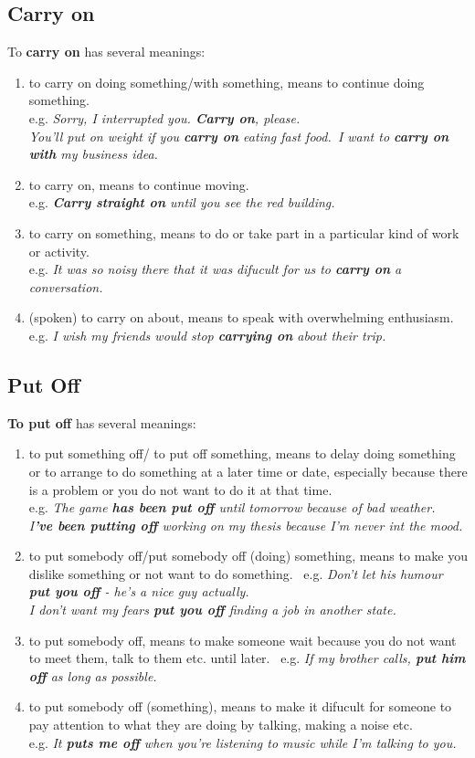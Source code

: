 \documentclass[hidelinks,10pt,a4paper]{article}
\begin{document}
\subsection{Carry on}
To \textbf{carry on} has several meanings:
\begin{enumerate}[label=(\alph*)]
	\item to carry on doing something/with something, means to continue doing something. \\
		e.g. \textit{Sorry, I interrupted you. \textbf{Carry on}, please.\\
		You'll put on weight if you \textbf{carry on} eating fast food.\
		I want to \textbf{carry on with} my business idea. }
	\item to carry on, means to continue moving. \\
		e.g. \textit{\textbf{Carry straight on} until you see the red building. }
	\item to carry on something, means to do or take part in a particular kind of work or activity. \\
		e.g. \textit{It was so noisy there that it was difucult for us to \textbf{carry on} a conversation. }
	\item (spoken) to carry on about, means to speak with overwhelming enthusiasm.\\
		e.g. \textit{I wish my friends would stop \textbf{carrying on} about their trip. }
\end{enumerate}

\subsection{Put Off}
\textbf{To put off} has several meanings:
\begin{enumerate}[label=(\alph*)]
	\item to put something off/ to put off something, means to delay doing something or to arrange to do something at a later time or date, especially because there is a problem or you do not want to do it at that time. \\
		e.g. \textit{The game \textbf{has been put off} until tomorrow because of bad weather. \\
		I\textbf{'ve been putting off} working on my thesis because I'm never int the mood. }
	\item to put somebody off/put somebody off (doing) something, means to make you dislike something or not want to do something. \
		e.g. \textit{Don't let his humour \textbf{put you off} - he's a nice guy actually.\\
		I don't want my fears \textbf{put you off} finding a job in another state. }
	\item to put somebody off, means to make someone wait because you do not want to meet them, talk to them etc. until later. \
		e.g. \textit{If my brother calls, \textbf{put him off} as long as possible. }
	\item to put somebody off (something), means to make it difucult for someone to pay attention to what they are doing by talking, making a noise etc. \\
		e.g. \textit{It \textbf{puts me off} when you're listening to music while I'm talking to you. }
\end{enumerate}
\end{document}
